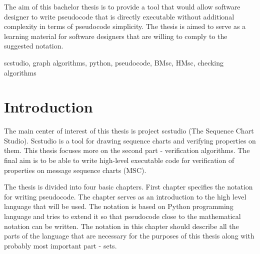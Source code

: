 \documentclass[11pt,oneside]{fithesis2}
\begin{document}
\lstset{language=Python,breaklines,stepnumber=1,numbers=right,numberstyle=\tiny,numbersep=5pt}
\FrontMatter  
\ThesisTitlePage  
 
\begin{ThesisDeclaration}  
\DeclarationText  
\AdvisorName  
\end{ThesisDeclaration}  
 
\begin{ThesisThanks}  
\end{ThesisThanks}  

\begin{ThesisAbstract}  
The aim of this bachelor thesis is to provide a tool that would allow software designer to write pseudocode that is directly executable without additional complexity in terms of pseudocode simplicity. The thesis is aimed to serve as a learning material for software designers that are willing to comply to the suggested notation.


\end{ThesisAbstract}  

\begin{ThesisKeyWords}  
scstudio, graph algorithms, python, pseudocode, BMsc, HMsc, checking algorithms
\end{ThesisKeyWords}  
 
\MainMatter  
\tableofcontents          %
 
\chapter{Introduction}    %
The main center of interest of this thesis is project scstudio (The Sequence Chart Studio)\cite{scstudio,scstudio2}. Scstudio is a tool for drawing sequence charts and verifying properties on them. This thesis focuses more on the second part - verification algorithms. The final aim is to be able to write high-level executable code for verification of properties on message sequence charts (MSC).

The thesis is divided into four basic chapters. First chapter specifies the notation for writing pseudocode. The chapter serves as an introduction to the high level language that will be used. The notation is based on Python\cite{python,python2} programming language and tries to extend it so that pseudocode close to the mathematical notation can be written. The notation in this chapter should describe all the parts of the language that are necessary for the purposes of this thesis along with probably most important part - sets.
\end{document}
